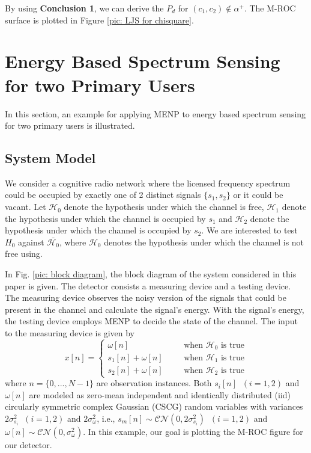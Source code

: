 \documentclass[12pt,journal,a4paper,twoside,onecolumn,draft]{IEEEtran}
\begin{document}
\begin{spacing}{2.5}
By using \textbf{Conclusion 1}, we can derive the $P_d$ for $(c_1, c_2) \notin \alpha^+$.
The M-ROC surface is plotted in Figure \ref{pic: LJS for chisquare}.

\section{Energy Based Spectrum Sensing for two Primary Users}
In this section, an example for applying MENP to energy based spectrum sensing for two primary users is illustrated.

\subsection{System Model}
We consider a cognitive radio network where the licensed frequency spectrum could be occupied by exactly one of 2 distinct signals $\{s_1, s_2\}$ or it could be vacant.
Let $\mathcal{H}_0$ denote the hypothesis under which the channel is free, $\mathcal{H}_1$ denote the hypothesis under which the channel is occupied by $s_1$ and $\mathcal{H}_2$ denote the hypothesis under which the channel is occupied by $s_2$. We are interested to test $H_0$ against $\bar{\mathcal{H}_0}$, where $\mathcal{H}_0$ denotes the hypothesis under which the channel is not free using.

In Fig. \ref{pic: block diagram}, the block diagram of the system considered in this paper is given. 
The detector consists a measuring device and a testing device. 
The measuring device observes the noisy version of the signals that could be present in the channel and calculate the signal's energy. 
With the signal's energy, the testing device employs MENP to decide the state of the channel.
The input to the measuring device is given by
\begin{equation}
x[n] = \begin{cases}
\omega[n]\;\;\;\;\;\;&\text{when $\mathcal{H}_0$ is true}\\
s_1[n]+\omega[n]\;\;\;\;\;\;&\text{when $\mathcal{H}_1$ is true}\\
s_2[n]+\omega[n]\;\;\;\;\;\;&\text{when $\mathcal{H}_2$ is true}
\end{cases}
\end{equation}
where $n = \{0, ..., N-1\}$ are observation instances.
Both $s_i[n]\;\;(i=1, 2)$ and $\omega[n]$ are modeled as zero-mean independent and identically distributed (iid) circularly symmetric complex Gaussian (CSCG) random variables with variances $2\sigma_{s_i}^2\;\;(i=1, 2)$ and $2\sigma_{\omega}^2$, i.e., $s_m[n] \sim \mathcal{CN}(0, 2\sigma_{s_i}^2)\;\;(i=1, 2)$ and $\omega[n] \sim \mathcal{CN}(0, \sigma_{\omega}^2)$. In this example, our goal is plotting the M-ROC figure for our detector. 


\end{spacing}
\end{document}
